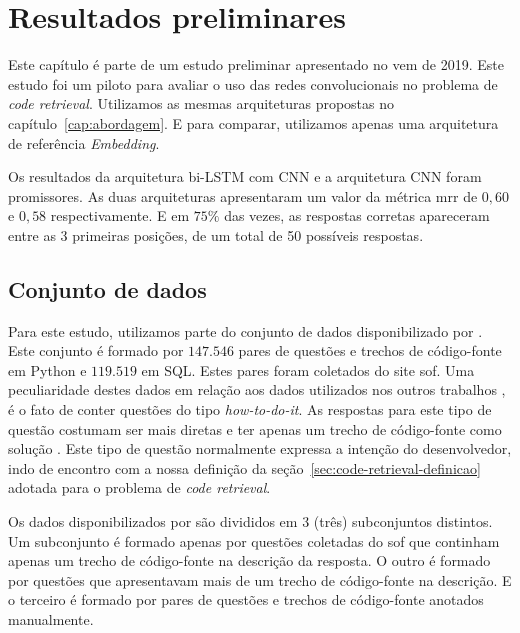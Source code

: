 \chapter{Resultados preliminares}
\label{cap:resultados-preliminares}

Este capítulo é parte de um estudo preliminar \citep{marcelo-vem-2019} apresentado no \acrfull{vem} de 2019. Este estudo foi um piloto para avaliar o uso das redes convolucionais no problema de \textit{code retrieval}. Utilizamos as mesmas arquiteturas propostas no capítulo~\ref{cap:abordagem}. E para comparar, utilizamos apenas uma arquitetura de referência \textit{Embedding}.

Os resultados da arquitetura bi-LSTM com CNN e a arquitetura CNN foram promissores. As duas arquiteturas apresentaram um valor da métrica \acrfull{mrr} de $0,60$ e $0,58$ respectivamente. E em $75\%$ das vezes, as respostas corretas apareceram entre as 3 primeiras posições, de um total de 50 possíveis respostas.

\section{Conjunto de dados}
\label{sec:conjunto-dados}

Para este estudo, utilizamos parte do conjunto de dados disponibilizado por \cite{yao-2018}. Este conjunto é formado por $\bm{147.546}$ pares de questões e trechos de código-fonte em Python e $\bm{119.519}$ em SQL. Estes pares foram coletados do site \Gls{sof}. Uma peculiaridade destes dados em relação aos dados utilizados nos outros trabalhos \cite{iyer-etal-2016-summarizing, Allamanis-bimodal-source-code-natural-language:2015}, é o fato de conter questões do tipo \textit{how-to-do-it}. As respostas para este tipo de questão costumam ser mais diretas e ter apenas um trecho de código-fonte como solução \citep{yao-2018}. Este tipo de questão normalmente expressa a intenção do desenvolvedor, indo de encontro com a nossa definição da seção~\ref{sec:code-retrieval-definicao} adotada para o problema de \textit{code retrieval}.

Os dados disponibilizados por \cite{yao-2018} são divididos em 3 (três) subconjuntos distintos. Um subconjunto é formado apenas por questões coletadas do \Gls{sof} que continham apenas um trecho de código-fonte na descrição da resposta. O outro é formado por questões que apresentavam mais de um trecho de código-fonte na descrição. E o terceiro é formado por pares de questões e trechos de código-fonte anotados manualmente.

